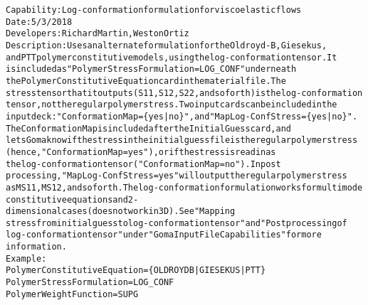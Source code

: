\documentclass{article}
\begin{document}
\begin{alltt}
Capability: Log-conformation formulation for viscoelastic flows
Date: 5/3/2018
Developers: Richard Martin, Weston Ortiz
Description:  Uses an alternate formulation for the Oldroyd-B, Giesekus,
and PTT polymer constitutive models, using the log-conformation tensor. It
is included as "Polymer Stress Formulation = LOG_CONF" underneath
the Polymer Constitutive Equation card in the material file. The
stress tensor that it outputs (S11, S12, S22, and so forth) is the log-conformation
tensor, not the regular polymer stress. Two input cards can be included in the
input deck: "Conformation Map = \{yes|no\}", and "Map Log-Conf Stress = \{yes|no\}".
The Conformation Map is included after the Initial Guess card, and
lets Goma know if the stress in the initial guess file is the regular polymer stress
(hence, "Conformation Map = yes"), or if the stress is read in as
the log-conformation tensor ("Conformation Map = no"). In post
processing, "Map Log-Conf Stress = yes" will output the regular polymer stress
as MS11, MS12, and so forth. The log-conformation formulation works for multimode
constitutive equations and 2-dimensional cases (does not work in 3D). See "Mapping
stress from initial guess to log-conformation tensor" and "Post processing of
log-conformation tensor" under "Goma Input File Capabilities" for more
information.
Example:
Polymer Constitutive Equation = \{OLDROYDB | GIESEKUS | PTT\}
Polymer Stress Formulation = LOG_CONF
Polymer Weight Function = SUPG

\end{alltt}
\end{document}
